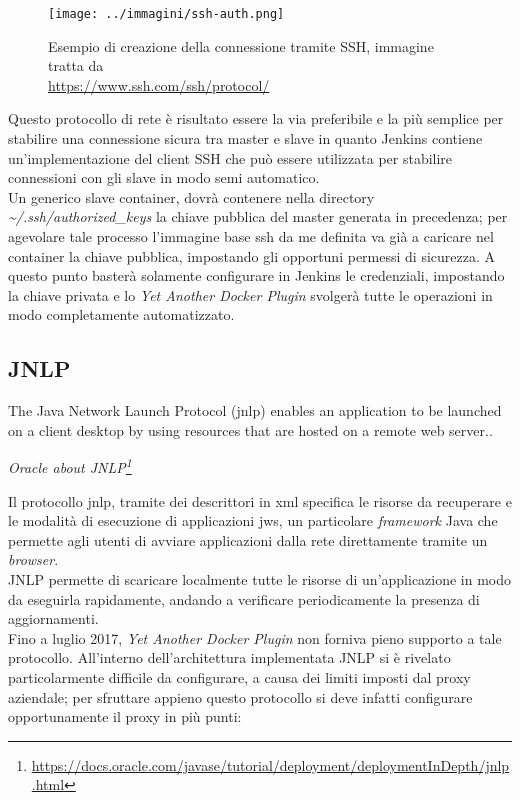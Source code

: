 \begin{figure}[H]
    \capstart
    \label{fig:ssh-connection}
    \captionsetup{justification=centering}
    \centering
    \texttt{[image: ../immagini/ssh-auth.png]}
    \caption[Esempio di creazione della connessione tramite SSH]{Esempio di creazione della connessione tramite SSH, immagine tratta da \\ \url{https://www.ssh.com/ssh/protocol/}}
\end{figure}

Questo protocollo di rete è risultato essere la via preferibile e la più semplice per stabilire una connessione sicura tra master e slave in quanto Jenkins contiene un'implementazione del client SSH che può essere utilizzata per stabilire connessioni con gli slave in modo semi automatico. \\
Un generico slave container, dovrà contenere nella directory \textit{\textasciitilde/.ssh/authorized\_keys} la chiave pubblica del master generata in precedenza; per agevolare tale processo l'immagine base ssh da me definita va già a caricare nel container la chiave pubblica, impostando gli opportuni permessi di sicurezza. A questo punto basterà solamente configurare in Jenkins le credenziali, impostando la chiave privata e lo \textit{Yet Another Docker Plugin} svolgerà tutte le operazioni in modo completamente automatizzato.

\subsection{JNLP}
\label{subsec:jnlp}

\begin{shadequote}
    The Java Network Launch Protocol (\gls{jnlp}) enables an application to be launched on a client desktop by using resources that are hosted on a remote web server..\par\emph{Oracle about JNLP\footnote{\url{https://docs.oracle.com/javase/tutorial/deployment/deploymentInDepth/jnlp.html}}}
\end{shadequote}

Il protocollo \gls{jnlp}, tramite dei descrittori in \gls{xml} specifica le risorse da recuperare e le modalità di esecuzione di applicazioni \gls{jws}, un particolare \textit{framework} Java che permette agli utenti di avviare applicazioni dalla rete direttamente tramite un \textit{browser}. \\
JNLP permette di scaricare localmente tutte le risorse di un'applicazione in modo da eseguirla rapidamente, andando a verificare periodicamente la presenza di aggiornamenti. \\
Fino a luglio 2017, \textit{Yet Another Docker Plugin} non forniva pieno supporto a tale protocollo.
All'interno dell'architettura implementata JNLP si è rivelato particolarmente difficile da configurare, a causa dei limiti imposti dal proxy aziendale; per sfruttare appieno questo protocollo si deve infatti configurare opportunamente il proxy in più punti:

